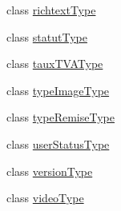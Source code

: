 \begin{DoxyCompactItemize}
\item 
class \hyperlink{class_acme_group_1_1_labo_bundle_1_1_form_1_1richtext_type}{richtext\+Type}
\item 
class \hyperlink{class_acme_group_1_1_labo_bundle_1_1_form_1_1statut_type}{statut\+Type}
\item 
class \hyperlink{class_acme_group_1_1_labo_bundle_1_1_form_1_1taux_t_v_a_type}{taux\+T\+V\+A\+Type}
\item 
class \hyperlink{class_acme_group_1_1_labo_bundle_1_1_form_1_1type_image_type}{type\+Image\+Type}
\item 
class \hyperlink{class_acme_group_1_1_labo_bundle_1_1_form_1_1type_remise_type}{type\+Remise\+Type}
\item 
class \hyperlink{class_acme_group_1_1_labo_bundle_1_1_form_1_1user_status_type}{user\+Status\+Type}
\item 
class \hyperlink{class_acme_group_1_1_labo_bundle_1_1_form_1_1version_type}{version\+Type}
\item 
class \hyperlink{class_acme_group_1_1_labo_bundle_1_1_form_1_1video_type}{video\+Type}
\end{DoxyCompactItemize}
